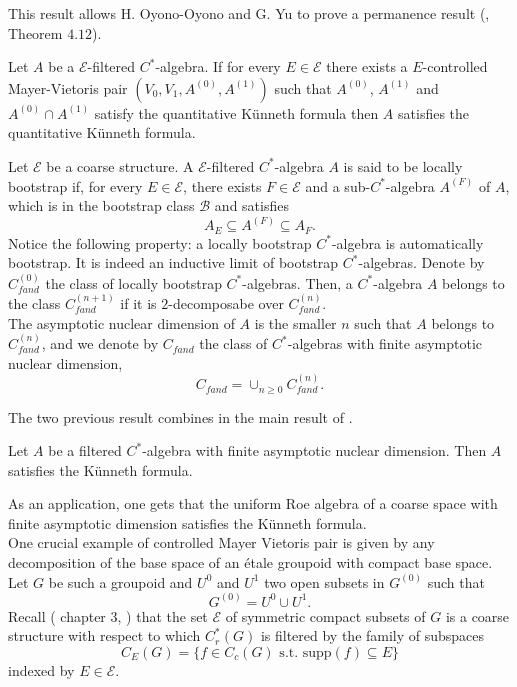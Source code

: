 This result allows H. Oyono-Oyono and G. Yu to prove a permanence result (\cite{OY4}, Theorem $4.12$).

\begin{thm}
Let $A$ be a $\mathcal E$-filtered $C^*$-algebra. If for every $E\in \mathcal E$ there exists a $E$-controlled Mayer-Vietoris pair $(V_0, V_1, A^{(0)}, A^{(1)})$ such that $A^{(0)}$, $A^{(1)}$ and $A^{(0)} \cap A^{(1)}$ satisfy the quantitative Künneth formula then $A$ satisfies the quantitative Künneth formula.   
\end{thm}

Let $\mathcal E$ be a coarse structure. A $\mathcal E$-filtered $C^*$-algebra $A$ is said to be locally bootstrap if, for every $E\in \mathcal E$, there exists $F\in \mathcal E$ and a sub-$C^*$-algebra $A^{(F)}$ of $A$, which is in the bootstrap class $\mathcal B$ and satisfies
\[A_E \subseteq A^{(F)}\subseteq A_F. \]
Notice the following property: a locally bootstrap $C^*$-algebra is automatically bootstrap. It is indeed an inductive limit of bootstrap $C^*$-algebras. Denote by $C_{fand}^{(0)}$ the class of locally bootstrap $C^*$-algebras. Then, a $C^*$-algebra $A$ belongs to the class $C^{(n+1)}_{fand}$ if it is $2$-decomposabe over $C_{fand}^{(n)}$. \\

The asymptotic nuclear dimension of $A$ is the smaller $n$ such that $A$ belongs to $C^{(n)}_{fand}$, and we denote by $C_{fand}$ the class of $C^*$-algebras with finite asymptotic nuclear dimension,
\[ C_{fand}  = \cup_{n\geq 0} C_{fand}^{(n)}.\]

The two previous result combines in the main result of \cite{OY4}.
\begin{thm}
Let $A$ be a filtered $C^*$-algebra with finite asymptotic nuclear dimension. Then $A$ satisfies the Künneth formula. \end{thm}

As an application, one gets that the uniform Roe algebra of a coarse space with finite asymptotic dimension satisfies the Künneth formula.\\

One crucial example of controlled Mayer Vietoris pair is given by any decomposition of the base space of an \'etale groupoid with compact base space. Let $G$ be such a groupoid and $U^0$ and $U^1$ two open subsets in $G^{(0)}$ such that
\[G^{(0)} = U^0 \cup U^1. \]
Recall (\cite{DellAieraThesis} chapter $3$, \cite{dell2017controlled}) that the set $\mathcal E$ of symmetric compact subsets of $G$ is a coarse structure with respect to which $C_r^*(G)$ is filtered by the family of subspaces 
\[C_E(G) = \{ f\in C_c(G) \text{ s.t. supp}(f)\subseteq E  \}\]
indexed by $E\in \mathcal E$.\\

